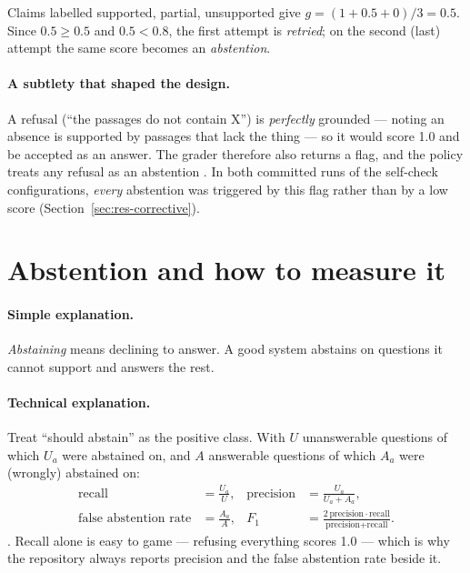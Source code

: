 \begin{example}
Claims labelled supported, partial, unsupported give $g=(1+0.5+0)/3=0.5$. Since $0.5\ge0.5$ and $0.5<0.8$, the first attempt is \emph{retried}; on the second (last) attempt the same score becomes an \emph{abstention}.
\end{example}

\paragraph{A subtlety that shaped the design.} A refusal (``the passages do not contain X'') is \emph{perfectly} grounded --- noting an absence is supported by passages that lack the thing --- so it would score 1.0 and be accepted as an answer. The grader therefore also returns a  flag, and the policy treats any refusal as an abstention . In both committed runs of the self-check configurations, \emph{every} abstention was triggered by this flag rather than by a low score (Section~\ref{sec:res-corrective}).

\section{Abstention and how to measure it}
\label{sec:abstention-metrics}

\paragraph{Simple explanation.} \emph{Abstaining} means declining to answer. A good system abstains on questions it cannot support and answers the rest.

\paragraph{Technical explanation.} Treat ``should abstain'' as the positive class. With $U$ unanswerable questions of which $U_a$ were abstained on, and $A$ answerable questions of which $A_a$ were (wrongly) abstained on:
\begin{align}
\text{recall} &= \frac{U_a}{U}, &
\text{precision} &= \frac{U_a}{U_a + A_a}, \\
\text{false abstention rate} &= \frac{A_a}{A}, &
F_1 &= \frac{2\,\text{precision}\cdot\text{recall}}{\text{precision}+\text{recall}}.
\end{align}
. Recall alone is easy to game --- refusing everything scores 1.0 --- which is why the repository always reports precision and the false abstention rate beside it.

